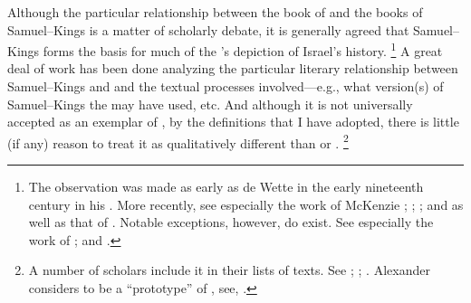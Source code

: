 Although the particular relationship between the book of \chronicles and the books of Samuel--Kings is a matter of scholarly debate, it is generally agreed that Samuel--Kings forms the basis for much of the \chronicler's depiction of Israel's history.%
    \footnote{The observation was made as early as de Wette in the early nineteenth century in his \cite*{dewette1806}. More recently, see especially the work of McKenzie
        \cite*{mckenzie1985};
        \cite{mckenzie_graham-mckenzie1999};
        \cite[66--71]{knoppers2003}; and 
        \cite[30--42]{klein2006} as well as that of 
        \cite[74--74]{carr2011}. Notable exceptions, however, do exist. See especially the work of 
        \cite{auld1994}; 
        \cite{auld_graham-mckenzie1999} and 
        \cite{person2010}.}
A great deal of work has been done analyzing the particular literary relationship between Samuel--Kings and \chronicles and the textual processes involved---e.g., what version(s) of Samuel--Kings the \chronicler may have used, etc. And although it is not universally accepted as an exemplar of \rwb, by the definitions that I have adopted, there is little (if any) reason to treat it as qualitatively different than \ga or \jub.%
    \footnote{A number of scholars include it in their lists of \rwb texts. See 
        \cite{campbell_zsengeller2014};
        \cite{zahn_lim-collins2010};
        \cite{bernstein_textus2005}.
        Alexander considers \chronicles to be a ``prototype'' of \rwb, see, 
        \cite[100]{alexander_carson-williamson1988}.}

